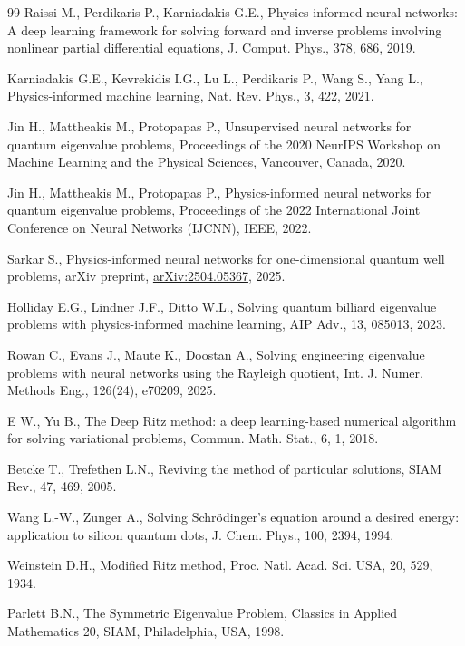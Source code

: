 \documentclass[10pt]{amsart}
\theoremstyle{definition}
\theoremstyle{remark}
\theoremstyle{plain}
\begin{document}
\begin{thebibliography}{99}
Raissi M., Perdikaris P., Karniadakis G.E., Physics-informed neural networks: A deep learning
framework for solving forward and inverse problems involving nonlinear partial differential
equations, J. Comput. Phys., 378, 686, 2019.

Karniadakis G.E., Kevrekidis I.G., Lu L., Perdikaris P., Wang S., Yang L., Physics-informed machine
learning, Nat. Rev. Phys., 3, 422, 2021.

Jin H., Mattheakis M., Protopapas P., Unsupervised neural networks for quantum eigenvalue problems,
Proceedings of the 2020 NeurIPS Workshop on Machine Learning and the Physical Sciences, Vancouver,
Canada, 2020.

Jin H., Mattheakis M., Protopapas P., Physics-informed neural networks for quantum eigenvalue
problems, Proceedings of the 2022 International Joint Conference on Neural Networks (IJCNN), IEEE,
2022.

Sarkar S., Physics-informed neural networks for one-dimensional quantum well problems, arXiv
preprint, \href{https://arxiv.org/abs/2504.05367}{arXiv:2504.05367}, 2025.

Holliday E.G., Lindner J.F., Ditto W.L., Solving quantum billiard eigenvalue problems with
physics-informed machine learning, AIP Adv., 13, 085013, 2023.

Rowan C., Evans J., Maute K., Doostan A., Solving engineering eigenvalue problems with neural
networks using the Rayleigh quotient, Int. J. Numer. Methods Eng., 126(24), e70209, 2025.

E W., Yu B., The Deep Ritz method: a deep learning-based numerical algorithm for solving variational
problems, Commun. Math. Stat., 6, 1, 2018.

Betcke T., Trefethen L.N., Reviving the method of particular solutions, SIAM Rev., 47, 469, 2005.

Wang L.-W., Zunger A., Solving Schr\"odinger's equation around a desired energy: application to
silicon quantum dots, J. Chem. Phys., 100, 2394, 1994.

Weinstein D.H., Modified Ritz method, Proc. Natl. Acad. Sci. USA, 20, 529, 1934.

Parlett B.N., The Symmetric Eigenvalue Problem, Classics in Applied Mathematics 20, SIAM,
Philadelphia, USA, 1998.


\end{thebibliography}
\end{document}
